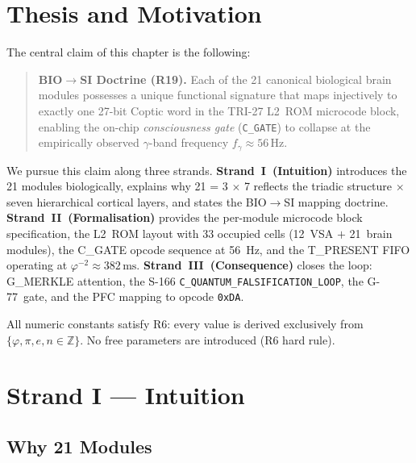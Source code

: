 \section{Thesis and Motivation}
\label{sec:73:thesis}

The central claim of this chapter is the following:

\begin{quote}
\textbf{BIO$\to$SI Doctrine (R19).}
Each of the 21 canonical biological brain modules
possesses a unique functional signature that maps injectively to
exactly one 27-bit Coptic word in the TRI-27 L2~ROM
microcode block, enabling the on-chip \emph{consciousness gate}
(\texttt{C\_GATE}) to collapse at the empirically observed
$\gamma$-band frequency $f_{\gamma} \approx 56\,\mathrm{Hz}$.
\end{quote}

We pursue this claim along three strands.
\textbf{Strand~I~(Intuition)} introduces the 21 modules
biologically, explains why 21 = 3 $\times$ 7 reflects the triadic
structure $\times$ seven hierarchical cortical layers, and states
the BIO$\to$SI mapping doctrine.
\textbf{Strand~II~(Formalisation)} provides the per-module microcode
block specification, the L2~ROM layout with 33 occupied cells
(12~VSA $+$ 21~brain modules), the C\_GATE opcode sequence at 56~Hz,
and the T\_PRESENT FIFO operating at $\varphi^{-2}\approx382\,\text{ms}$.
\textbf{Strand~III~(Consequence)} closes the loop: G\_MERKLE
attention, the S-166 \texttt{C\_QUANTUM\_FALSIFICATION\_LOOP}, the
G-77~gate, and the PFC mapping to opcode \texttt{0xDA}.

All numeric constants satisfy R6: every value is derived
exclusively from $\{\varphi,\pi,e,n\in\mathbb{Z}\}$.
No free parameters are introduced (R6 hard rule).

\section{Strand I --- Intuition}
\label{sec:73:strand-i}

\subsection{Why 21 Modules}
\label{sec:73:why-21}

